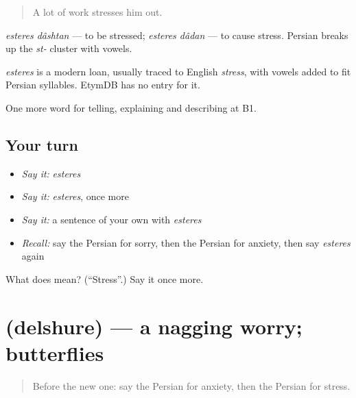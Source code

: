 \begin{quote}
A lot of work stresses him out.
\end{quote}

\emph{esteres dâshtan} — to be stressed; \emph{esteres dâdan} — to cause stress. Persian breaks up the \emph{st-} cluster with vowels.

\begin{cousinweb}
\emph{esteres} is a modern loan, usually traced to English \emph{stress}, with vowels added to fit Persian syllables. EtymDB has no entry for it.
\end{cousinweb}

\begin{grammarlens}[title={What you've built}]
One more word for telling, explaining and describing at B1.
\end{grammarlens}

\subsection*{Your turn}
\begin{itemize}
\raggedright
  \item \emph{Say it:} \emph{esteres}
  \item \emph{Say it:} \emph{esteres}, once more
  \item \emph{Say it:} a sentence of your own with \emph{esteres}
  \item \emph{Recall:} say the Persian for sorry, then the Persian for anxiety, then say \emph{esteres} again
\end{itemize}

\begin{tcolorbox}[breakable,colback=teal!4,colframe=teal!35!black,title={Before you move on}]
What does  mean? (\textquotedblleft{}Stress\textquotedblright{}.) Say it once more.
\end{tcolorbox}
\section[\texorpdfstring{\fa{دلشوره} (delshure)}{دلشوره (delshure)}]{ (delshure) — a nagging worry; butterflies}

\label{lesson:FA-C485-delshure}



\begin{quote}
Before the new one: say the Persian for anxiety, then the Persian for stress.
\end{quote}

